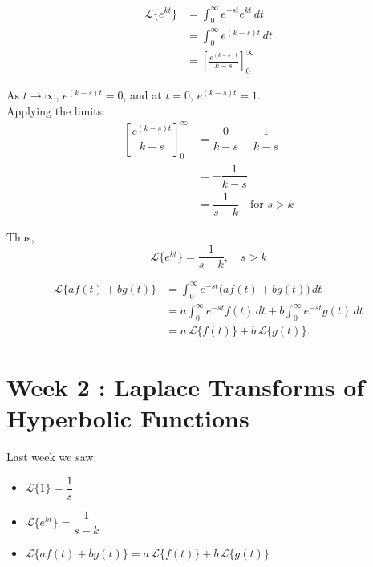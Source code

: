 \documentclass[a4paper]{extarticle}
\theoremstyle{definition}
\theoremstyle{plain}
\begin{document}
\begin{notebox}
  \begin{align*}
    \mathcal{L}\{e^{kt}\}
     & = \int_{0}^{\infty} e^{-st} e^{kt} \, dt           \\[6pt]
     & = \int_{0}^{\infty} e^{(k-s)t} \, dt               \\[6pt]
     & = \left[\frac{e^{(k-s)t}}{k-s}\right]_{0}^{\infty}
  \end{align*}

  As \(t \to \infty\), \(e^{(k-s)t} = 0\), and at \(t = 0\), \(e^{(k-s)t} = 1\).\\
  Applying the limits:
  \begin{align*}
    \left[\dfrac{e^{(k-s)t}}{k-s}\right]_0^\infty
     & = \dfrac{0}{k-s} - \dfrac{1}{k-s}        \\[6pt]
     & = -\dfrac{1}{k-s}                        \\[6pt]
     & = \dfrac{1}{s-k} \quad \text{for } s > k
  \end{align*}

  Thus,
  \[
    \mathcal{L}\{e^{kt}\} = \dfrac{1}{s-k}, \quad s > k
  \]
\end{notebox}

\begin{notebox}
  \begin{align*}
    \mathcal{L}\{a f(t) + b g(t)\}
     & = \int_{0}^{\infty} e^{-st} \Big(a f(t) + b g(t)\Big) \, dt \\[6pt]
     & = a \int_{0}^{\infty} e^{-st} f(t) \, dt
    + b \int_{0}^{\infty} e^{-st} g(t) \, dt                       \\[6pt]
     & = a\,\mathcal{L}\{f(t)\} + b\,\mathcal{L}\{g(t)\}.
  \end{align*}
\end{notebox}
\newpage
\section{Week 2 : Laplace Transforms of Hyperbolic Functions}
Last week we saw:
\begin{itemize}
  \setlength\itemsep{1pt}
  \item \(\mathcal{L}\{1\} = \dfrac{1}{s}\)
  \item \(\mathcal{L}\{e^{kt}\} = \dfrac{1}{s-k}\)
  \item \(\mathcal{L}\{a f(t) + b g(t)\} = a\,\mathcal{L}\{f(t)\} + b\,\mathcal{L}\{g(t)\}\)
\end{itemize}
\end{document}
